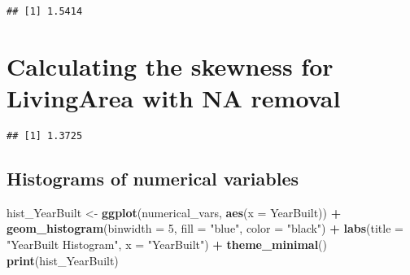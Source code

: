 \documentclass[
]{article}
\newenvironment{Shaded}{\begin{snugshade}}{\end{snugshade}}
\newcommand{\AttributeTok}[1]{\textcolor[rgb]{0.13,0.29,0.53}{#1}}
\newcommand{\ConstantTok}[1]{\textcolor[rgb]{0.56,0.35,0.01}{#1}}
\newcommand{\DecValTok}[1]{\textcolor[rgb]{0.00,0.00,0.81}{#1}}
\newcommand{\FunctionTok}[1]{\textcolor[rgb]{0.13,0.29,0.53}{\textbf{#1}}}
\newcommand{\NormalTok}[1]{#1}
\newcommand{\OtherTok}[1]{\textcolor[rgb]{0.56,0.35,0.01}{#1}}
\newcommand{\SpecialCharTok}[1]{\textcolor[rgb]{0.81,0.36,0.00}{\textbf{#1}}}
\newcommand{\StringTok}[1]{\textcolor[rgb]{0.31,0.60,0.02}{#1}}
\begin{document}
\begin{Shaded}
\end{Shaded}

\begin{verbatim}
## [1] 1.5414
\end{verbatim}

\hypertarget{calculating-the-skewness-for-livingarea-with-na-removal}{%
\section{Calculating the skewness for LivingArea with NA
removal}\label{calculating-the-skewness-for-livingarea-with-na-removal}}

\begin{Shaded}
\end{Shaded}

\begin{verbatim}
## [1] 1.3725
\end{verbatim}

\hypertarget{histograms-of-numerical-variables}{%
\subsection{Histograms of numerical
variables}\label{histograms-of-numerical-variables}}

\begin{Shaded}
\begin{Highlighting}[]
\NormalTok{hist\_YearBuilt }\OtherTok{\textless{}{-}} \FunctionTok{ggplot}\NormalTok{(numerical\_vars, }\FunctionTok{aes}\NormalTok{(}\AttributeTok{x =}\NormalTok{ YearBuilt)) }\SpecialCharTok{+}
  \FunctionTok{geom\_histogram}\NormalTok{(}\AttributeTok{binwidth =} \DecValTok{5}\NormalTok{, }\AttributeTok{fill =} \StringTok{"blue"}\NormalTok{, }\AttributeTok{color =} \StringTok{"black"}\NormalTok{) }\SpecialCharTok{+}
  \FunctionTok{labs}\NormalTok{(}\AttributeTok{title =} \StringTok{"YearBuilt Histogram"}\NormalTok{, }\AttributeTok{x =} \StringTok{"YearBuilt"}\NormalTok{) }\SpecialCharTok{+}
  \FunctionTok{theme\_minimal}\NormalTok{()}
\FunctionTok{print}\NormalTok{(hist\_YearBuilt)}
\end{Highlighting}
\end{Shaded}
\end{document}
